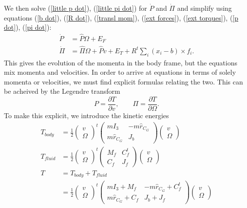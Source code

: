 \documentclass{aims}
\theoremstyle{definition}
\begin{document}
We then solve (\ref{little p dot}), (\ref{little pi dot}) for $\dot{P}$ and $\dot{\Pi}$ and simplify using equations (\ref{b dot}), (\ref{R dot}), (\ref{transl mom}), (\ref{ext forces}), (\ref{ext torques}), (\ref{p dot}), (\ref{pi dot}):  %
\begin{align}
\dot{P} &= \hat{P}\Omega + E_F \label{P dot} \\
\dot{\Pi} &= \hat{\Pi}\Omega + \hat{P}v + E_T + R^t\sum_i(x_i-b) \times f_i. \label{Pi dot}
\end{align}
This gives the evolution of the momenta in the body frame, but the equations mix momenta and velocities.  In order to arrive at equations in terms of solely momenta or velocities, we must find explicit formulas relating the two.  This can be acheived by the Legendre transform
\begin{equation*}
P = \frac{\partial T}{\partial v}, \qquad
\Pi = \frac{\partial T}{\partial \Omega}.
\end{equation*}
To make this explicit, we introduce the kinetic energies
\begin{align}
T_{body} &= \frac{1}{2}\begin{pmatrix}
v \\ \Omega
\end{pmatrix}^t
\begin{pmatrix}
mI_3 & -m\hat{r}_{C_G} \\ m\hat{r}_{C_G} & J_b \end{pmatrix} 
\begin{pmatrix} v \\ \Omega \end{pmatrix} \label{kinetic body}  \\
T_{fluid} &= \frac{1}{2}\begin{pmatrix}
v \\ \Omega
\end{pmatrix}^t
\begin{pmatrix}
M_f & C_f^t \\ C_f & J_f \end{pmatrix} 
\begin{pmatrix} v \\ \Omega \end{pmatrix}  \label{kinetic fluid}\\
T &= T_{body} + T_{fluid} \nonumber \\
&= \frac{1}{2}\begin{pmatrix}
v \\ \Omega
\end{pmatrix}^t
\begin{pmatrix}
mI_3+M_f & -m\hat{r}_{C_G} +C_f^t\\ m\hat{r}_{C_G} +C_f & J_b +J_f \end{pmatrix} 
\begin{pmatrix} v \\ \Omega \end{pmatrix} \label{kinetic total} 
\end{align}
\end{document}
